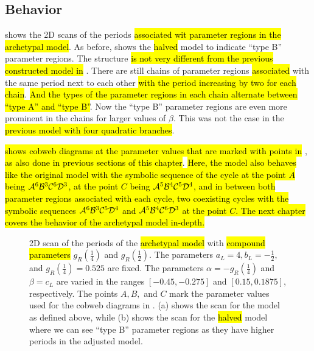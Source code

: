 \subsection{Behavior}
\label{sec:setup.arch.behavior}

 shows the 2D scans of the periods \hl{associated wit parameter regions in the archetypal model}.
As before,  shows the \hl{halved} model to indicate ``type B'' parameter regions.
The structure \hl{is not very different from the previous constructed model in} .
There are still chains of parameter regions \hl{associated} with the same period next to each other \hl{with the period increasing by two for each chain}.
\hl{And the types of the parameter regions in each chain alternate between ``type A'' and ``type B''}.
Now the ``type B'' parameter regions are even more prominent in the chains for larger values of $\beta$.
This was not the case in the \hl{previous model with four quadratic branches}.

 \hl{shows cobweb diagrams at the parameter values that are marked with points in} , \hl{as also done in previous sections of this chapter}.
\hl{
	Here, the model also behaves like the original model with the symbolic sequence of the cycle at the point $A$ being $\mathcal{A}^6\mathcal{B}^3\mathcal{C}^6\mathcal{D}^3$, at the point $C$ being $\mathcal{A}^5\mathcal{B}^4\mathcal{C}^5\mathcal{D}^4$, and in between both parameter regions associated with each cycle, two coexisting cycles with the symbolic sequences $\mathcal{A}^6\mathcal{B}^3\mathcal{C}^5\mathcal{D}^4$ and $\mathcal{A}^5\mathcal{B}^4\mathcal{C}^6\mathcal{D}^3$ at the point $C$.
	The next chapter covers the behavior of the archetypal model in-depth.
}

\begin{figure}
	\centering
	\caption[2D scans of the periods of the archetypal model]{
		2D scan of the periods of the \hl{archetypal model} with \hl{compound parameters} $g_R\left(\frac{1}{4}\right)$ and $g_R\left(\frac{1}{2}\right)$.
		The parameters $a_L = 4, b_L = -\frac{1}{2},$ and $g_R\left(\frac{1}{4}\right) = 0.525$ are fixed.
		The parameters $\alpha = -g_R\left(\frac{1}{4}\right)$ and $\beta = c_L$ are varied in the ranges $[-0.45, -0.275]$ and $[0.15, 0.1875]$, respectively.
		The points $A, B,$ and $C$ mark the parameter values used for the cobweb diagrams in .
		(a) shows the scan for the model as defined above, while (b) shows the scan for the \hl{halved} model where we can see ``type B'' parameter regions as they have higher periods in the adjusted model.
	}
	\label{fig:setup.arch.period}
\end{figure}


